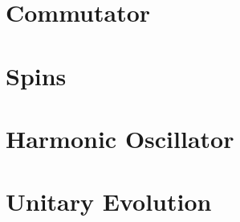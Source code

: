 \documentclass[12pt,letterpaper]{refart}
\begin{document}



\section{Commutator}




\section{Spins}




\section{Harmonic Oscillator}




\section{Unitary Evolution}





\clearpage

\renewcommand*{\bibfont}{\raggedright\normalfont\small}

\end{document}
